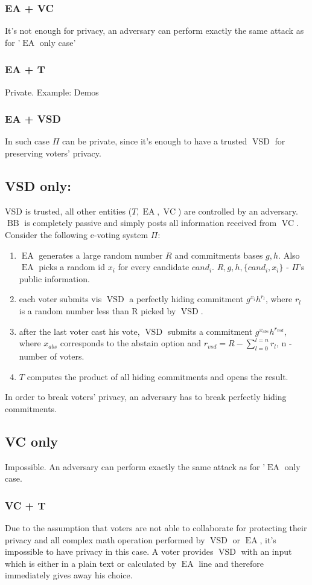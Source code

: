 \documentclass[12pt]{article}
\DeclareMathOperator{\vsd}{VSD}
\DeclareMathOperator{\ea}{EA}
\DeclareMathOperator{\bb}{BB}
\DeclareMathOperator{\voc}{VC}
\begin{document}
\subsubsection{EA + VC}
 It's not enough for privacy, an adversary can perform exactly the same attack as for '$\ea$ only case'
\subsubsection{EA + T}
Private. Example: Demos 
\subsubsection{EA + VSD}
 In such case $\Pi$ can be private, since it's enough to have a trusted $\vsd$ for preserving voters' privacy.
\subsection{VSD only:}
 VSD is trusted, all other entities ($T,\ea,\voc$) are controlled by an adversary. $\bb$ is completely passive and simply posts all information received from $\voc$. 
Consider the following e-voting system $\Pi$:
\begin{enumerate}
 \item $\ea$ generates a large random number $R$ and commitments bases $g,h$. Also $\ea$ picks a random id  $x_i$ for every candidate $cand_i$. $R,g,h, \{cand_i,x_i\}$  - $\Pi$'s public information. 
 \item each voter submits vis $\vsd$ a perfectly hiding commitment $g^{x_i}h^{r_l}$, where $r_l$ is a random number less than R picked by $\vsd$. 
 \item after the last voter cast his vote, $\vsd$ submits a commitment $g^{x_{abs}}h^{r_{vsd}}$, where $x_{abs}$ corresponds to the abstain option and $r_{vsd} = R - \sum_{l=0}^{l=n}r_l$, n - number of voters.  
 \item $T$ computes the product of all hiding commitments and opens the result.
 \end{enumerate}
  In order to break voters' privacy, an adversary has to break perfectly hiding commitments. 
\subsection{VC only}
  Impossible.   An adversary can perform exactly the same attack as for '$\ea$ only case.
\subsubsection{VC + T}
 Due to the assumption that voters are not able to collaborate for protecting their privacy and all complex math operation performed by $\vsd$ or $\ea$, it's impossible to have privacy in this case. A voter provides $\vsd$ with an input which is either in a plain text or calculated by $\ea$ line and therefore immediately gives away his choice.
\end{document}
